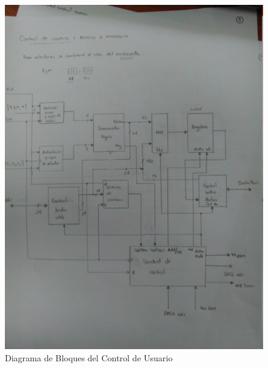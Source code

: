 \documentclass[12pt,a4paper]{report}
\begin{document}
\begin{figure}[hbtp]
	\centering
	\includegraphics[width=15cm]{Img/ControlUsuarioBloques.jpg}
	\caption{Diagrama de Bloques del Control de Usuario}
	\label{fig:BloquesUsuario1}
\end{figure}
\end{document}
